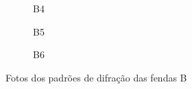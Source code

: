 \begin{figure}[H]
    \centering

    \begin{subfigure}[t]{.6\textwidth}
        \centering
        
        \caption{B4}
        \label{fig:B4}
    \end{subfigure}
    \qquad
    \begin{subfigure}[t]{.6\textwidth}
        \centering
        
        \caption{B5}
        \label{fig:B5}
    \end{subfigure}
    \qquad
    \begin{subfigure}[t]{.6\textwidth}
        \centering
        
        \caption{B6}
        \label{fig:B6}
    \end{subfigure}

    \caption{Fotos dos padrões de difração das fendas B}
    \label{fig:B}
\end{figure}